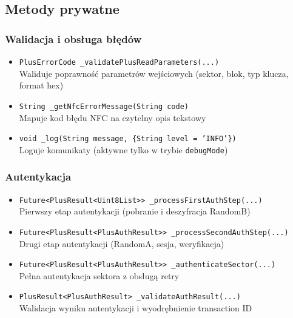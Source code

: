 \documentclass[a4paper,12pt]{article}
\begin{document}
\subsection{Metody prywatne}

\subsubsection*{Walidacja i obsługa błędów}
\begin{itemize}
    \item \texttt{PlusErrorCode \_validatePlusReadParameters(...)}\\
    Waliduje poprawność parametrów wejściowych (sektor, blok, typ klucza, format hex)
    
    \item \texttt{String \_getNfcErrorMessage(String code)}\\
    Mapuje kod błędu NFC na czytelny opis tekstowy
    
    \item \texttt{void \_log(String message, \{String level = 'INFO'\})}\\
    Loguje komunikaty (aktywne tylko w trybie \texttt{debugMode})
\end{itemize}

\subsubsection*{Autentykacja}
\begin{itemize}
    \item \texttt{Future<PlusResult<Uint8List>> \_processFirstAuthStep(...)}\\
    Pierwszy etap autentykacji (pobranie i deszyfracja RandomB)
    
    \item \texttt{Future<PlusResult<PlusAuthResult>> \_processSecondAuthStep(...)}\\
    Drugi etap autentykacji (RandomA, sesja, weryfikacja)
    
    \item \texttt{Future<PlusResult<PlusAuthResult>> \_authenticateSector(...)}\\
    Pełna autentykacja sektora z obsługą retry
    
    \item \texttt{PlusResult<PlusAuthResult> \_validateAuthResult(...)}\\
    Walidacja wyniku autentykacji i wyodrębnienie transaction ID
\end{itemize}
\end{document}
